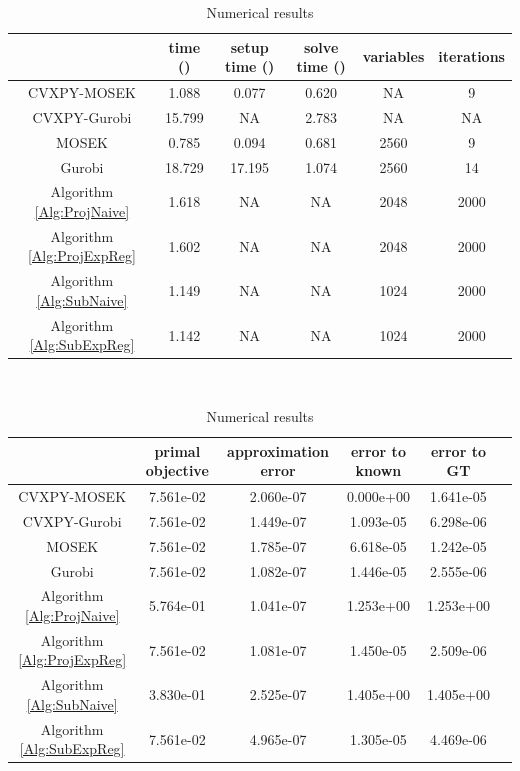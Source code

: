 \documentclass[english]{pkupaper}
\begin{document}
\begin{table}[htbp]
\centering
\begin{tabular}{|c|c|c|c|c|c|}
\hline
& time (\Si{\second}) & setup time (\Si{\second}) & solve time (\Si{\second}) & variables & iterations \\ \hline
CVXPY-MOSEK & 1.088 & 0.077 & 0.620 & NA & 9  \\ \hline
CVXPY-Gurobi & 15.799 & NA & 2.783 & NA & NA \\ \hline
MOSEK & 0.785 & 0.094 & 0.681 & 2560 & 9 \\ \hline
Gurobi & 18.729 & 17.195 & 1.074 & 2560 & 14 \\ \hline
Algorithm \ref{Alg:ProjNaive} & 1.618 & NA & NA & 2048 & 2000 \\ \hline
Algorithm \ref{Alg:ProjExpReg} & 1.602 & NA & NA & 2048 & 2000 \\ \hline
Algorithm \ref{Alg:SubNaive} & 1.149 & NA & NA & 1024 & 2000 \\ \hline
Algorithm \ref{Alg:SubExpReg} & 1.142 & NA & NA & 1024 & 2000 \\ \hline
\end{tabular}

\ 

\begin{tabular}{|c|c|c|c|c|c|}
\hline
& primal objective & approximation error & error to known & error to GT \\ \hline
CVXPY-MOSEK & 7.561e-02 & 2.060e-07 & 0.000e+00 & 1.641e-05 \\ \hline
CVXPY-Gurobi & 7.561e-02 & 1.449e-07 & 1.093e-05 & 6.298e-06 \\ \hline
MOSEK & 7.561e-02 & 1.785e-07 & 6.618e-05 & 1.242e-05 \\ \hline
Gurobi & 7.561e-02 & 1.082e-07 & 1.446e-05 & 2.555e-06 \\ \hline
Algorithm \ref{Alg:ProjNaive} & 5.764e-01 & 1.041e-07 & 1.253e+00 & 1.253e+00 \\ \hline
Algorithm \ref{Alg:ProjExpReg} & 7.561e-02 & 1.081e-07 & 1.450e-05 & 2.509e-06 \\ \hline
Algorithm \ref{Alg:SubNaive} & 3.830e-01 & 2.525e-07 & 1.405e+00 & 1.405e+00 \\ \hline
Algorithm \ref{Alg:SubExpReg} & 7.561e-02 & 4.965e-07 & 1.305e-05 & 4.469e-06 \\ \hline
\end{tabular}

\caption{Numerical results} \label{Tbl:NumRes}
\end{table}
\end{document}
